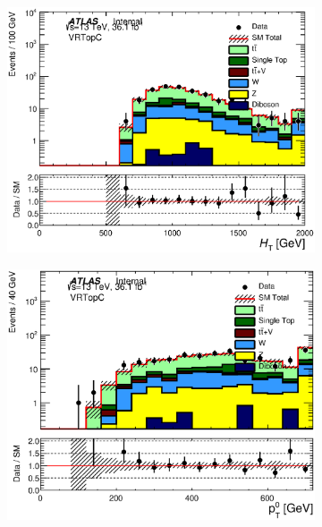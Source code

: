 \begin{figure}[h!]
\begin{center}
    \begin{subfigure}[b]{0.40\textwidth}    
    	 \includegraphics[width=\textwidth]{figures/plotRegion/Ht_VRTopC_log.eps}
                \caption{ }
    \end{subfigure}
    \begin{subfigure}[b]{0.40\textwidth}    
    	 \includegraphics[width=\textwidth]{figures/plotRegion/JetPt_0__VRTopC_log.eps}
                \caption{ }
    \end{subfigure}
    \begin{subfigure}[b]{0.40\textwidth}    

\end{subfigure}
\end{center}
\end{figure}

